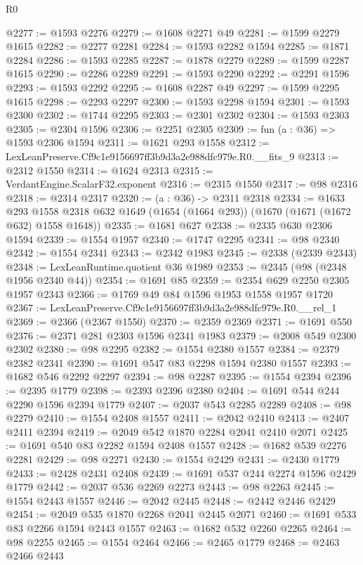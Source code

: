 \begin{lexlean}{R0}
\begin{coremodule}
@2277 := @1593 @2276
@2279 := @1608 @2271 @49
@2281 := @1599 @2279 @1615
@2282 := @2277 @2281
@2284 := @1593 @2282 @1594
@2285 := @1871 @2284
@2286 := @1593 @2285
@2287 := @1878 @2279
@2289 := @1599 @2287 @1615
@2290 := @2286 @2289
@2291 := @1593 @2290
@2292 := @2291 @1596
@2293 := @1593 @2292
@2295 := @1608 @2287 @49
@2297 := @1599 @2295 @1615
@2298 := @2293 @2297
@2300 := @1593 @2298 @1594
@2301 := @1593 @2300
@2302 := @1744 @2295
@2303 := @2301 @2302
@2304 := @1593 @2303
@2305 := @2304 @1596
@2306 := @2251 @2305
@2309 := fun (a : @36) => @1593 @2306 @1594
@2311 := @1621 @293 @1558
@2312 := LexLeanPreserve.Cf9c1e9156697ff3b9d3a2e988dfc979e.R0.__fits_9
@2313 := @2312 @1550
@2314 := @1624 @2313
@2315 := VerdantEngine.ScalarF32.exponent
@2316 := @2315 @1550
@2317 := @98 @2316
@2318 := @2314 @2317
@2320 := (a : @36) -> @2311 @2318
@2334 := @1633
    @293
    @1558
    @2318
    @632
    @1649
    (@1654 (@1664 @293))
    (@1670 (@1671 (@1672 @632) @1558 @1648))
@2335 := @1681 @627
@2338 := @2335 @630 @2306 @1594
@2339 := @1554 @1957
@2340 := @1747 @2295
@2341 := @98 @2340
@2342 := @1554 @2341
@2343 := @2342 @1983
@2345 := @2338 (@2339 @2343)
@2348 := LexLeanRuntime.quotient @36 @1989
@2353 := @2345 (@98 (@2348 @1956 @2340 @44))
@2354 := @1691 @85
@2359 := @2354 @629 @2250 @2305 @1957 @2343
@2366 := @1769 @49 @84 @1596 @1953 @1558 @1957 @1720
@2367 := LexLeanPreserve.Cf9c1e9156697ff3b9d3a2e988dfc979e.R0.__rel_1
@2369 := @2366 (@2367 @1550)
@2370 := @2359 @2369
@2371 := @1691 @550
@2376 := @2371 @281 @2303 @1596 @2341 @1983
@2379 := @2008 @549 @2300 @2302
@2380 := @98 @2295
@2382 := @1554 @2380 @1557
@2384 := @2379 @2382 @2341
@2390 := @1691 @547 @83 @2298 @1594 @2380 @1557
@2393 := @1682 @546 @2292 @2297
@2394 := @98 @2287
@2395 := @1554 @2394
@2396 := @2395 @1779
@2398 := @2393 @2396 @2380
@2404 := @1691 @544 @244 @2290 @1596 @2394 @1779
@2407 := @2037 @543 @2285 @2289
@2408 := @98 @2279
@2410 := @1554 @2408 @1557
@2411 := @2042 @2410
@2413 := @2407 @2411 @2394
@2419 := @2049 @542 @1870 @2284 @2041 @2410 @2071
@2425 := @1691 @540 @83 @2282 @1594 @2408 @1557
@2428 := @1682 @539 @2276 @2281
@2429 := @98 @2271
@2430 := @1554 @2429
@2431 := @2430 @1779
@2433 := @2428 @2431 @2408
@2439 := @1691 @537 @244 @2274 @1596 @2429 @1779
@2442 := @2037 @536 @2269 @2273
@2443 := @98 @2263
@2445 := @1554 @2443 @1557
@2446 := @2042 @2445
@2448 := @2442 @2446 @2429
@2454 := @2049 @535 @1870 @2268 @2041 @2445 @2071
@2460 := @1691 @533 @83 @2266 @1594 @2443 @1557
@2463 := @1682 @532 @2260 @2265
@2464 := @98 @2255
@2465 := @1554 @2464
@2466 := @2465 @1779
@2468 := @2463 @2466 @2443

\end{coremodule}
\end{lexlean}
